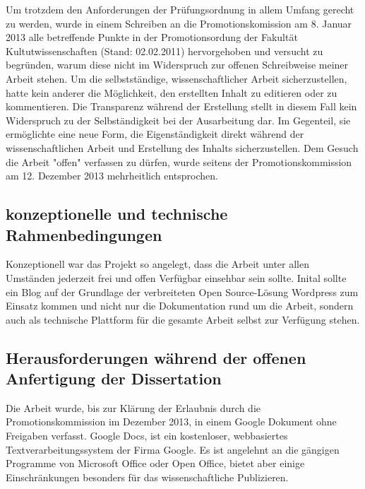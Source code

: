 Um trotzdem den Anforderungen der Prüfungsordnung in allem Umfang gerecht zu werden, wurde in einem Schreiben an die Promotionskomission am 8. Januar 2013 alle betreffende Punkte in der Promotionsordung der Fakultät Kultutwissenschaften (Stand: 02.02.2011) hervorgehoben und versucht zu begründen, warum diese nicht im Widerspruch zur offenen Schreibweise meiner Arbeit stehen. Um die selbstständige, wissenschaftlicher Arbeit sicherzustellen, hatte kein anderer die Möglichkeit, den erstellten Inhalt zu editieren oder zu kommentieren. Die Transparenz während der Erstellung stellt in diesem Fall kein Widerspruch zu der Selbständigkeit bei der Ausarbeitung dar. Im Gegenteil, sie ermöglichte eine neue Form, die Eigenständigkeit direkt während der wissenschaftlichen Arbeit und Erstellung des Inhalts sicherzustellen. Dem Gesuch die Arbeit "offen" verfassen zu dürfen, wurde seitens der Promotionskommission am 12. Dezember 2013 mehrheitlich entsprochen.

\subsection{konzeptionelle und technische Rahmenbedingungen}

Konzeptionell war das Projekt so angelegt, dass die Arbeit unter allen Umständen jederzeit frei und offen Verfügbar einsehbar sein sollte. Inital sollte ein Blog auf der Grundlage der verbreiteten Open Source-Lösung Wordpress zum Einsatz kommen und nicht nur die Dokumentation rund um die Arbeit, sondern auch als technische Plattform für die gesamte Arbeit selbst zur Verfügung stehen.

\subsection{Herausforderungen während der offenen Anfertigung der Dissertation}

Die Arbeit wurde, bis zur Klärung der Erlaubnis durch die Promotionskommission im Dezember 2013, in einem Google Dokument ohne Freigaben verfasst. Google Docs, ist ein kostenloser, webbasiertes Textverarbeitungssystem der Firma Google. Es ist angelehnt an die gängigen Programme von Microsoft Office oder Open Office, bietet aber einige Einschränkungen besonders für das wissenschaftliche Publizieren.

